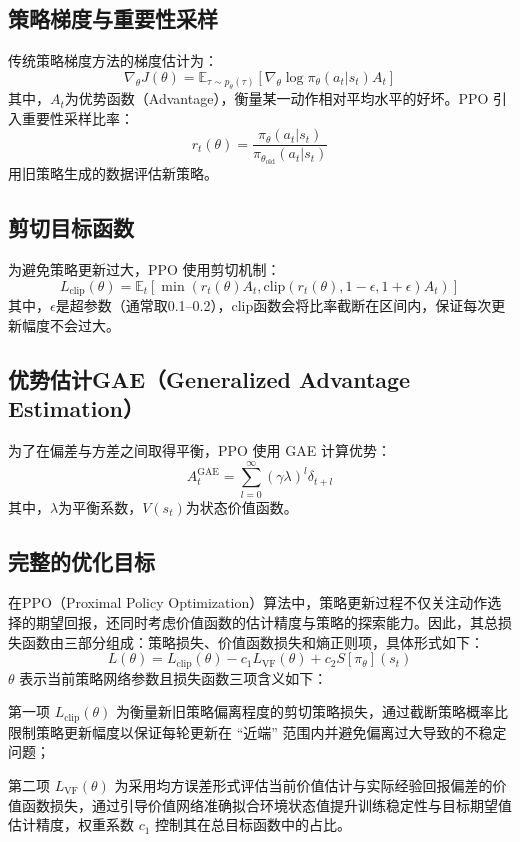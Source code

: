 \subsection{策略梯度与重要性采样}
传统策略梯度方法的梯度估计为：
\[
\nabla_{\theta} J(\theta) = \mathbb{E}_{\tau \sim p_{\theta}(\tau)} \left[ \nabla_{\theta} \log \pi_{\theta}(a_t|s_t) A_t \right]
\]
其中，$A_t$为优势函数（Advantage），衡量某一动作相对平均水平的好坏。PPO 引入重要性采样比率：
\[
r_t(\theta) = \frac{\pi_{\theta}(a_t|s_t)}{\pi_{\theta_{\text{old}}}(a_t|s_t)}
\]
用旧策略生成的数据评估新策略。

\subsection{剪切目标函数}
为避免策略更新过大，PPO 使用剪切机制：
\[
L_{\text{clip}}(\theta) = \mathbb{E}_t \left[ \min \left( r_t(\theta) A_t, \text{clip}(r_t(\theta), 1 - \epsilon, 1 + \epsilon) A_t \right) \right]
\]
其中，$\epsilon$是超参数（通常取0.1–0.2），$\text{clip}$函数会将比率截断在区间内，保证每次更新幅度不会过大。

\subsection{优势估计GAE（Generalized Advantage Estimation）}
为了在偏差与方差之间取得平衡，PPO 使用 GAE 计算优势：
\[
A_t^{\text{GAE}} = \sum_{l=0}^{\infty} (\gamma \lambda)^l \delta_{t+l}
\]
其中，$\lambda$为平衡系数，$V(s_t)$为状态价值函数。

\subsection{完整的优化目标}

在PPO（Proximal Policy Optimization）算法中，策略更新过程不仅关注动作选择的期望回报，还同时考虑价值函数的估计精度与策略的探索能力。因此，其总损失函数由三部分组成：策略损失、价值函数损失和熵正则项，具体形式如下：
\[
L(\theta) = L_{\text{clip}}(\theta) - c_1 L_{\text{VF}}(\theta) + c_2 S[\pi_{\theta}](s_t)
\]
$\theta$ 表示当前策略网络参数且损失函数三项含义如下：

第一项 $L_{\text{clip}}(\theta)$ 为衡量新旧策略偏离程度的剪切策略损失，通过截断策略概率比限制策略更新幅度以保证每轮更新在 “近端” 范围内并避免偏离过大导致的不稳定问题；

第二项 $L_{\text{VF}}(\theta)$ 为采用均方误差形式评估当前价值估计与实际经验回报偏差的价值函数损失，通过引导价值网络准确拟合环境状态值提升训练稳定性与目标期望值估计精度，权重系数 $c_1$ 控制其在总目标函数中的占比。

